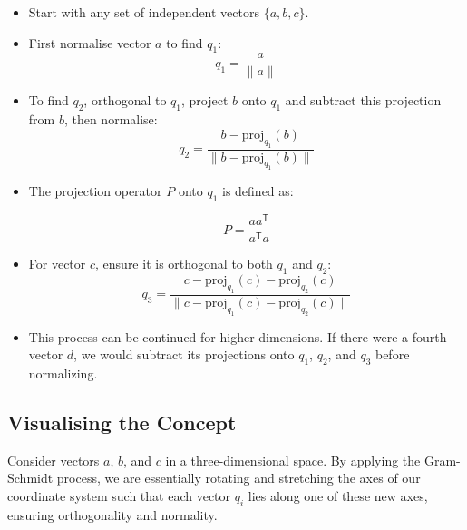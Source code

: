 \begin{itemize}
    \item Start with any set of independent vectors $\{a, b, c\}$.
    \item First normalise vector $a$ to find $q_1$:
    \begin{equation}
        q_1 = \frac{a}{\|a\|}
    \end{equation}
    \item To find $q_2$, orthogonal to $q_1$, project $b$ onto $q_1$ and subtract this projection from $b$, then normalise:
    \begin{equation}
        q_2 = \frac{b - \text{proj}_{q_1}(b)}{\|b - \text{proj}_{q_1}(b)\|}
    \end{equation}
    \item The projection operator $P$ onto $q_1$ is defined as:
    
    \begin{equation}
        P = \frac{a a^\mathsf{T}}{a^\mathsf{T}a}
    \end{equation}
    \item For vector $c$, ensure it is orthogonal to both $q_1$ and $q_2$:
    \begin{equation}
        q_3 = \frac{c - \text{proj}_{q_1}(c) - \text{proj}_{q_2}(c)}{\|c - \text{proj}_{q_1}(c) - \text{proj}_{q_2}(c)\|}
    \end{equation}
    \item This process can be continued for higher dimensions. If there were a fourth vector $d$, we would subtract its projections onto $q_1$, $q_2$, and $q_3$ before normalizing.
\end{itemize}

\subsection*{Visualising the Concept}

Consider vectors $a$, $b$, and $c$ in a three-dimensional space. By applying the Gram-Schmidt process, we are essentially rotating and stretching the axes of our coordinate system such that each vector $q_i$ lies along one of these new axes, ensuring orthogonality and normality.

